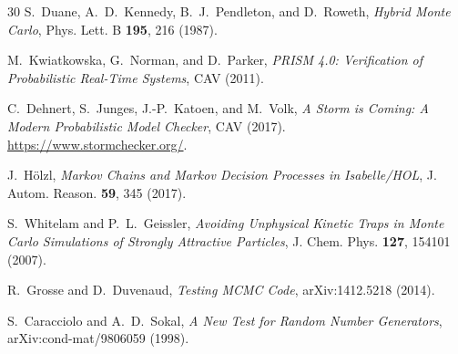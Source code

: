 \documentclass[11pt,a4paper]{article}
\begin{document}
\begin{thebibliography}{30}
S.~Duane, A.~D.~Kennedy, B.~J.~Pendleton, and D.~Roweth, \textit{Hybrid Monte Carlo}, Phys. Lett. B \textbf{195}, 216 (1987).

M.~Kwiatkowska, G.~Norman, and D.~Parker, \textit{PRISM 4.0: Verification of Probabilistic Real-Time Systems}, CAV (2011).

C.~Dehnert, S.~Junges, J.-P.~Katoen, and M.~Volk, \textit{A Storm is Coming: A Modern Probabilistic Model Checker}, CAV (2017). \url{https://www.stormchecker.org/}.

J.~Hölzl, \textit{Markov Chains and Markov Decision Processes in Isabelle/HOL}, J. Autom. Reason. \textbf{59}, 345 (2017).

S.~Whitelam and P.~L.~Geissler, \textit{Avoiding Unphysical Kinetic Traps in Monte Carlo Simulations of Strongly Attractive Particles}, J. Chem. Phys. \textbf{127}, 154101 (2007).

R.~Grosse and D.~Duvenaud, \textit{Testing MCMC Code}, arXiv:1412.5218 (2014).

S.~Caracciolo and A.~D.~Sokal, \textit{A New Test for Random Number Generators}, arXiv:cond-mat/9806059 (1998).

\end{thebibliography}
\end{document}
